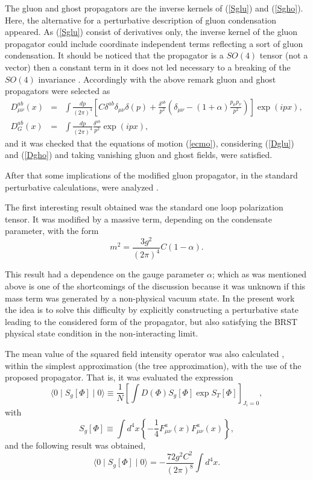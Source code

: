 \documentclass[12pt,letterpaper]{report}
\begin{document}
The gluon and ghost propagators are the inverse kernels of
(\ref{Sglu}) and (\ref{Sgho}). Here, the alternative for a
perturbative description of gluon condensation appeared. As
(\ref{Sglu}) consist of derivatives only, the inverse kernel of
the gluon propagator could include coordinate independent terms
reflecting a sort of gluon condensation. It should be noticed that
the propagator is a $SO\left(4\right)$ tensor (not a vector) then
a constant term in it does not led necessary to a breaking of the
$SO\left(4\right)$ invariance \cite{Cabo}. Accordingly with the
above remark gluon and ghost propagators were selected as
\begin{eqnarray}
D_{\mu \nu }^{ab}\left(x\right) &=&\int \frac{dp}{\left(2\pi
\right) ^4} \left[ C\delta ^{ab}\delta _{\mu \nu }\delta \left(
p\right) +\frac{\delta ^{ab}}{p^2}\left(\delta _{\mu \nu }-\left(
1+\alpha \right) \frac{p_\mu p_\nu }{p^2}\right) \right] \exp
\left(ipx\right), \label{Dglu} \\ D_G^{ab}\left(x\right) &=&\int
\frac{dp}{\left(2\pi \right) ^4}\frac{ \delta ^{ab}}{p^2}\exp
\left(ipx\right), \label{Dgho}
\end{eqnarray}
and it was checked that the equations of motion (\ref{ecmo}),
considering (\ref{Dglu}) and (\ref{Dgho}) and taking vanishing
gluon and ghost fields, were satisfied.

After that some implications of the modified gluon propagator, in
the standard perturbative calculations, were analyzed \cite{Cabo}.

The first interesting result obtained was the standard one loop
polarization tensor. It was modified by a massive term, depending
on the condensate parameter, with the form
\begin{equation}
m^2=\frac{3g^2}{\left(2\pi \right) ^4}C\left(1-\alpha \right).
\label{mass}
\end{equation}

This result had a dependence on the gauge parameter $\alpha$;
which as was mentioned above is one of the shortcomings of the
discussion \cite{Cabo} because it was unknown if this mass term
was generated by a non-physical vacuum state. In the present work
the idea is to solve this difficulty by explicitly constructing a
perturbative state leading to the considered form of the
propagator, but also satisfying the BRST physical state condition
in the non-interacting limit.

The mean value of the squared field intensity operator was also
calculated \cite{Cabo}, within the simplest approximation (the
tree approximation), with the use of the proposed propagator. That
is, it was evaluated the expression
\[
\langle 0\mid S_g\left[ \Phi \right] \mid 0\rangle \equiv \frac
1N\left[ \int D\left(\Phi \right) S_g\left[ \Phi \right] \exp
S_T\left[ \Phi \right] \right] _{J_i=0},
\]
with
\[
S_g\left[ \Phi \right] \equiv \int d^4x\left\{ -\frac 14F_{\mu \nu
}^a\left(x\right) F_{\mu \nu }^a\left(x\right) \right\},
\]
and the following result was obtained,
\begin{equation}
\langle 0\mid S_g\left[ \Phi \right] \mid 0\rangle
=-\frac{72g^2C^2}{\left(2\pi \right) ^8}\int d^4x.
\end{equation}
\end{document}
